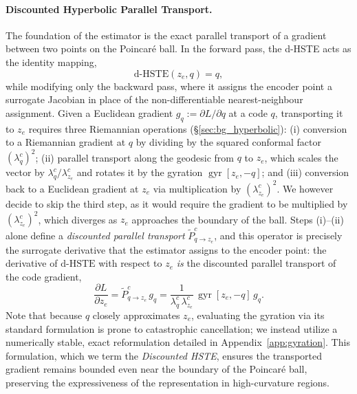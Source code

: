 \documentclass[12pt]{report}
\begin{document}
\paragraph{Discounted Hyperbolic Parallel Transport.}
The foundation of the estimator is the exact parallel transport of a gradient between two points on the Poincar\'e ball. In the forward pass, the d-HSTE acts as the identity mapping,
\begin{equation}
    \label{eq:hste_forward}
    \mathrm{d\text{-}HSTE}(z_e,q) = q,
\end{equation}
while modifying only the backward pass, where it assigns the encoder point a surrogate Jacobian in place of the non-differentiable nearest-neighbour assignment. Given a Euclidean gradient $g_q := \partial L/\partial q$ at a code $q$, transporting it to $z_e$ requires three Riemannian operations (\S\ref{sec:bg_hyperbolic}): (i) conversion to a Riemannian gradient at $q$ by dividing by the squared conformal factor $(\lambda^c_q)^2$; (ii) parallel transport along the geodesic from $q$ to $z_e$, which scales the vector by $\lambda^c_q/\lambda^c_{z_e}$ and rotates it by the gyration $\operatorname{gyr}[z_e,-q]$; and (iii) conversion back to a Euclidean gradient at $z_e$ via multiplication by $(\lambda^c_{z_e})^2$. We however decide to skip the third step, as it would require the gradient to be multiplied by $(\lambda^c_{z_e})^2$, which diverges as $z_e$ approaches the boundary of the ball. Steps (i)--(ii) alone define a \emph{discounted parallel transport} $\widetilde P^c_{q\to z_e}$, and this operator is precisely the surrogate derivative that the estimator assigns to the encoder point: the derivative of $\mathrm{d\text{-}HSTE}$ with respect to $z_e$ \emph{is} the discounted parallel transport of the code gradient,
\begin{equation}
    \label{eq:hste_backward}
    \frac{\partial L}{\partial z_e}
    = \widetilde P^c_{q\to z_e}\,g_q
    = \frac{1}{\lambda^c_q\,\lambda^c_{z_e}}\,\operatorname{gyr}[z_e,-q]\,g_q .
\end{equation}
Note that because $q$ closely approximates $z_e$, evaluating the gyration via its standard formulation is prone to catastrophic cancellation; we instead utilize a numerically stable, exact reformulation detailed in Appendix~\ref{app:gyration}. This formulation, which we term the \emph{Discounted HSTE}, ensures the transported gradient remains bounded even near the boundary of the Poincar\'e ball, preserving the expressiveness of the representation in high-curvature regions.
\end{document}
